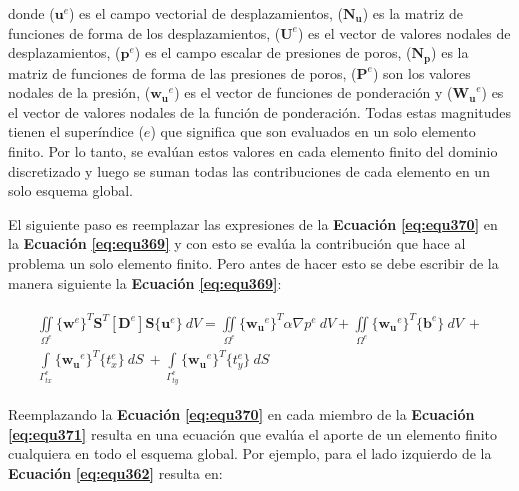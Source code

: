 \bigskip
donde ($\mathbf{u}^e$) es el campo vectorial de desplazamientos, ($\mathbf{N_u}$) es la matriz de funciones de forma de los desplazamientos, ($\mathbf{U}^e$) es el vector de valores nodales de desplazamientos, ($\mathbf{p}^e$) es el campo escalar de presiones de poros, ($\mathbf{N_p}$) es la matriz de funciones de forma de las presiones de poros, ($\mathbf{P}^e$) son los valores nodales de la presión, ($\mathbf{w_u}^e$) es el vector de funciones de ponderación y ($\mathbf{W_u}^e$) es el vector de valores nodales de la función de ponderación. Todas estas magnitudes tienen el superíndice ($e$) que significa que son evaluados en un solo elemento finito. Por lo tanto, se evalúan estos valores en cada elemento finito del dominio discretizado y luego se suman todas las contribuciones de cada elemento en un solo esquema global.\bigskip

El siguiente paso es reemplazar las expresiones de la \textbf{Ecuación} \textbf{\ref{eq:equ370}} en la \textbf{Ecuación} \textbf{\ref{eq:equ369}} y con esto se evalúa la contribución que hace al problema un solo elemento finito. Pero antes de hacer esto se debe escribir de la manera siguiente la \textbf{Ecuación} \textbf{\ref{eq:equ369}}:\bigskip

\begin{ceqn} 
\begin{gather}\label{eq:equ371}
\begin{multlined}
\iint \limits_{\Omega^e} \{\mathbf{w}^e\}^T \mathbf{S}^T[\mathbf{D}^e]\mathbf{S}\{\mathbf{u}^e\}\ dV = 
\iint \limits_{\Omega^e} \{\mathbf{w_u}^e\}^T \alpha \nabla p^e\ dV +
\iint \limits_{\Omega^e} \{\mathbf{w_u}^e\}^T \{\mathbf{b}^e\}\ dV\ +\\[10pt]
\int \limits_{\Gamma^e_{tx}} \{\mathbf{w_u}^e\}^T \{t^e_x\}\ dS\ +
\int \limits_{\Gamma^e_{ty}} \{\mathbf{w_u}^e\}^T \{t^e_y\}\ dS
\end{multlined}
\end{gather}  
\end{ceqn}

Reemplazando la \textbf{Ecuación} \textbf{\ref{eq:equ370}} en cada miembro de la \textbf{Ecuación} \textbf{\ref{eq:equ371}} resulta en una ecuación que evalúa el aporte de un elemento finito cualquiera en todo el esquema global. Por ejemplo, para el lado izquierdo de la \textbf{Ecuación} \textbf{\ref{eq:equ362}} resulta en:\bigskip


